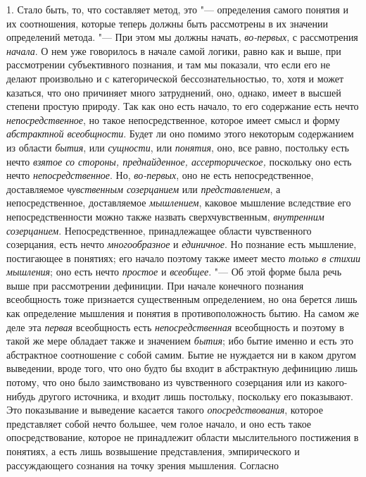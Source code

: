 {{1. Стало быть, то, что составляет метод, это
"--- определения самого понятия и их соотношения, которые теперь
должны быть рассмотрены в их значении определений метода. "---
При этом мы должны начать, {\em во-первых}, с рассмотрения {\em начала}.
О нем уже говорилось в начале самой логики, равно как и выше,
при рассмотрении субъективного познания, и там мы показали, что если его не
делают произвольно и с категорической бессознательностью, то, хотя и может
казаться, что оно причиняет много затруднений, оно, однако,
имеет в высшей степени простую природу. Так как оно есть начало, то его
содержание есть нечто {\em непосредственное},
но такое непосредственное, которое имеет смысл и форму
{\em абстрактной всеобщности}.
Будет ли оно помимо этого некоторым содержанием из области
{\em бытия}, или {\em сущности}, или {\em понятия}, оно, все
равно, постольку есть нечто {\em взятое
со стороны, преднайденное, ассерторическое,} поскольку оно
есть нечто {\em непосредственное}. Но, {\em во-первых},
оно не есть непосредственное, доставляемое
{\em чувственным созерцанием} или {\em представлением},
а непосредственное, доставляемое {\em мышлением}, каковое
мышление вследствие его непосредственности можно также назвать
сверхчувственным, {\em внутренним
созерцанием}. Непосредственное, принадлежащее области
чувственного созерцания, есть нечто
{\em многообразное} и {\em единичное}. Но
познание есть мышление, постигающее в понятиях; его начало поэтому также
имеет место {\em только в стихии
мышления}; оно есть нечто {\em простое} и {\em всеобщее}. "--- Об этой
форме была речь выше при рассмотрении дефиниции. При начале конечного
познания всеобщность тоже признается существенным определением, но она
берется лишь как определение мышления и понятия в противоположность бытию.
На самом же деле эта {\em первая} всеобщность есть {\em непосредственная}
всеобщность и поэтому в такой же мере обладает также и значением {\em бытия};
ибо бытие именно и есть это абстрактное соотношение с собой
самим. Бытие не нуждается ни в каком другом выведении, вроде того, что оно
будто бы входит в абстрактную дефиницию лишь потому, что оно было
заимствовано из чувственного созерцания или из какого-нибудь другого
источника, и входит лишь постольку, поскольку его показывают. Это
показывание и выведение касается такого {\em опосредствования},
которое представляет собой нечто большее, чем голое начало, и
оно есть такое опосредствование, которое не принадлежит области
мыслительного постижения в понятиях, а есть лишь возвышение представления,
эмпирического и рассуждающего сознания на точку зрения мышления. Согласно
}}
